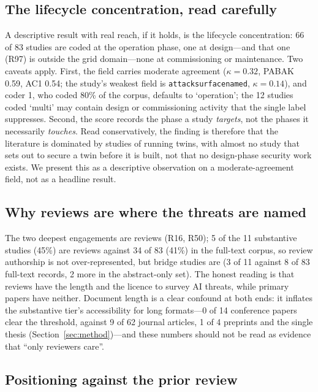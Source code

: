 \documentclass[preprint,12pt]{elsarticle}
\renewcommand{\_}{\plainunderscore\allowbreak}
\begin{document}
\subsection{The lifecycle concentration, read carefully}

A descriptive result with real reach, if it holds, is the lifecycle concentration:
66 of 83 studies are coded at the operation phase, one at design---and that one (R97) is
outside the grid domain---none at commissioning or maintenance. Two
caveats apply. First, the field carries moderate agreement ($\kappa = 0.32$, PABAK 0.59,
AC1 0.54; the study's weakest field is \texttt{attack\_surface\_named}, $\kappa = 0.14$), and
coder 1, who coded 80\% of the corpus, defaults to `operation'; the 12 studies coded `multi'
may contain design or commissioning activity that the single label suppresses. Second, the score
records the phase a study 
\emph{targets}, not the phases it necessarily 
\emph{touches}. Read conservatively, the finding is therefore that the literature is dominated
by studies of running twins, with almost no study that sets out to secure a twin before it is
built, not that no design-phase security work exists. We present this as a descriptive
observation on a moderate-agreement field, not as a headline result.

\subsection{Why reviews are where the threats are named}

The two deepest engagements are reviews (R16, R50); 5 of the 11 substantive 
studies (45\%) are reviews against 34 of 83 (41\%) in the full-text corpus, so review 
authorship is not over-represented, but bridge studies are (3 of 11 against 8 of 83 full-text records, 2 more in the abstract-only set).
The honest reading is that reviews have the length and the licence to survey AI threats, while
primary papers have neither. Document length is a clear confound at both ends: it inflates
the substantive tier's accessibility for long formats---0 of 14 conference papers clear the
threshold, against 9 of 62 journal articles, 1 of 4 preprints and the single thesis
(Section~\ref{sec:method})---and these numbers should not be read as evidence that ``only
reviewers care''.

\subsection{Positioning against the prior review}
\end{document}
